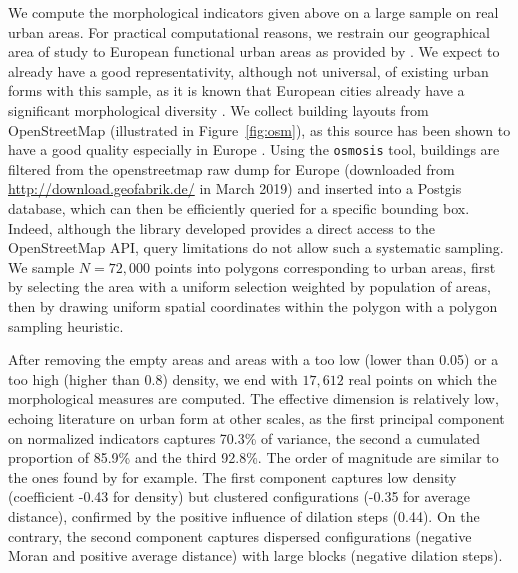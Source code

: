 \documentclass[letterpaper]{article}
\begin{document}
We compute the morphological indicators given above on a large sample on real urban areas. For practical computational reasons, we restrain our geographical area of study to European functional urban areas as provided by \cite{bretagnolle2019following}. We expect to already have a good representativity, although not universal, of existing urban forms with this sample, as it is known that European cities already have a significant morphological diversity \citep{le2015forme}. We collect building layouts from OpenStreetMap (illustrated in Figure~\ref{fig:osm}), as this source has been shown to have a good quality especially in Europe \citep{mooney2010towards}. Using the \texttt{osmosis} tool, buildings are filtered from the openstreetmap raw dump for Europe (downloaded from \url{http://download.geofabrik.de/} in March 2019) and inserted into a Postgis database, which can then be efficiently queried for a specific bounding box. Indeed, although the library developed provides a direct access to the OpenStreetMap API, query limitations do not allow such a systematic sampling.
We sample $N=72,000$ points into polygons corresponding to urban areas, first by selecting the area with a uniform selection weighted by population of areas, then by drawing uniform spatial coordinates within the polygon with a polygon sampling heuristic. %



After removing the empty areas and areas with a too low (lower than 0.05) or a too high (higher than 0.8) density, we end with $17,612$ real points on which the morphological measures are computed. The effective dimension is relatively low, echoing literature on urban form at other scales, as the first principal component on normalized indicators captures 70.3\% of variance, the second a cumulated proportion of 85.9\% and the third 92.8\%. The order of magnitude are similar to the ones found by \cite{Schwarz201029} for example. The first component captures low density (coefficient -0.43 for density) but clustered configurations (-0.35 for average distance), confirmed by the positive influence of dilation steps (0.44). On the contrary, the second component captures dispersed configurations (negative Moran and positive average distance) with large blocks (negative dilation steps).
\end{document}
